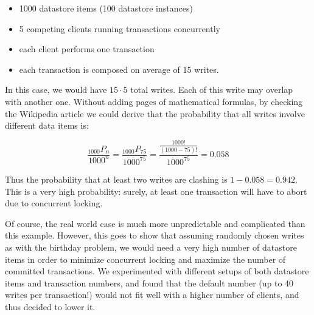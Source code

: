 \begin{itemize}
    \item 1000 datastore items (100 datastore instances)
    \item 5 competing clients running transactions concurrently
    \item each client performs one transaction
    \item each transaction is composed on average of 15 writes.
\end{itemize}

In this case, we would have $15 \cdot 5$ total writes. Each of this write may overlap with another one. Without adding pages of mathematical formulas, by checking the Wikipedia article we could derive that the probability that all writes involve different data items is:

$$
 \frac{_{1000}P_n}{1000^n} = \frac{_{1000}P_{75}}{1000^{75}} =
 \frac{\frac{1000!}{(1000-75)!}}{1000^{75}} = 0.058
$$

Thus the probability that at least two writes are clashing is $1 - 0.058 = 0.942$. This is a very high probability: surely, at least one transaction will have to abort due to concurrent locking.

Of course, the real world case is much more unpredictable and complicated than this example. However, this goes to show that assuming randomly chosen writes as with the birthday problem, we would need a very high number of datastore items in order to minimize concurrent locking and maximize the number of committed transactions. We experimented with different setups of both datastore items and transaction numbers, and found that the default number (up to 40 writes per transaction!) would not fit well with a higher number of clients, and thus decided to lower it.

